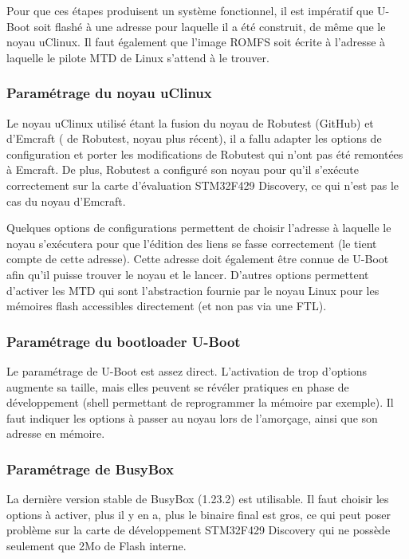 Pour que ces étapes produisent un système fonctionnel, il est impératif que U-Boot soit flashé à une adresse pour laquelle il a été construit, de même que le noyau uClinux.
Il faut également que l'image ROMFS soit écrite à l'adresse à laquelle le pilote MTD \autocite{MTD} de Linux s'attend à le trouver.


\subsubsection{Paramétrage du noyau uClinux}
Le noyau uClinux utilisé étant la fusion du noyau de Robutest (GitHub) et d'Emcraft ( de Robutest, noyau plus récent), il a fallu adapter les options de configuration et porter les modifications de Robutest qui n'ont pas été remontées à Emcraft.
De plus, Robutest a configuré son noyau pour qu'il s'exécute correctement sur la carte d'évaluation STM32F429 Discovery, ce qui n'est pas le cas du noyau d'Emcraft.

Quelques options de configurations permettent de choisir l'adresse à laquelle le noyau s'exécutera pour que l'édition des liens se fasse correctement (le  tient compte de cette adresse).
Cette adresse doit également être connue de U-Boot afin qu'il puisse trouver le noyau et le lancer.
D'autres options permettent d'activer les MTD \autocite{MTD} qui sont l'abstraction fournie par le noyau Linux pour les mémoires flash accessibles directement (et non pas via une \gls{FTL}).

\subsubsection{Paramétrage du bootloader U-Boot}
Le paramétrage de U-Boot est assez direct.
L'activation de trop d'options augmente sa taille, mais elles peuvent se révéler pratiques en phase de développement (shell permettant de reprogrammer la mémoire par exemple).
Il faut indiquer les options à passer au noyau lors de l'amorçage, ainsi que son adresse en mémoire.

\subsubsection{Paramétrage de BusyBox}
La dernière version stable de BusyBox (1.23.2) est utilisable.
Il faut choisir les options à activer, plus il y en a, plus le binaire final est gros, ce qui peut poser problème sur la carte de développement STM32F429 Discovery qui ne possède seulement que 2Mo de Flash interne.

